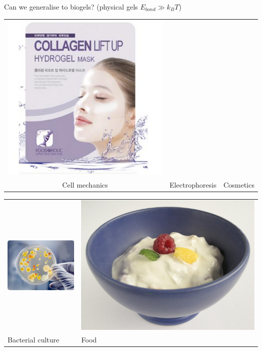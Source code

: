 \documentclass[xcolor=table]{beamer}
\begin{document}
\begin{frame}{Can we generalise to biogels? \textup{\normalsize(physical gels
$E_{bond}\gg k_B T$)}}
\begin{tabu}{cX[c]c}
\includegraphics[height=0.3\textheight]{cosmetics} \\
Cell mechanics & Electrophoresis & Cosmetics\\
\end{tabu}
\begin{tabu}{X[c]X[c]}
\includegraphics[height=0.3\textheight]{bacterial_culture} &
\includegraphics[height=0.3\textheight]{food} \\
Bacterial culture & Food\\
\end{tabu}


\end{frame}
\end{document}
